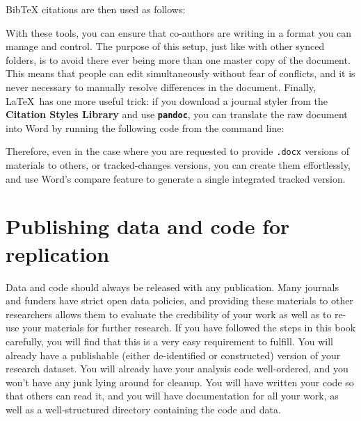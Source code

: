 \noindent BibTeX citations are then used as follows:


With these tools, you can ensure that co-authors are writing
in a format you can manage and control.\cite{flom2005latex}
The purpose of this setup, just like with other synced folders,
is to avoid there ever being more than one master copy of the document.
This means that people can edit simultaneously without fear of conflicts,
and it is never necessary to manually resolve differences in the document.
Finally, \LaTeX\ has one more useful trick:
if you download a journal styler from the \textbf{Citation Styles Library}
and use \textbf{\texttt{pandoc}},
you can translate the raw document into Word by running the following code from the command line:


Therefore, even in the case where you are requested to provide
\texttt{.docx} versions of materials to others, or tracked-changes versions,
you can create them effortlessly,
and use Word's compare feature to generate a single integrated tracked version.


\section{Publishing data and code for replication}

Data and code should always be released with any publication.
Many journals and funders have strict open data policies,
and providing these materials to other researchers
allows them to evaluate the credibility of your work
as well as to re-use your materials for further research.
If you have followed the steps in this book carefully,
you will find that this is a very easy requirement to fulfill.
You will already have a publishable (either de-identified or constructed)
version of your research dataset.
You will already have your analysis code well-ordered,
and you won't have any junk lying around for cleanup.
You will have written your code so that others can read it,
and you will have documentation for all your work,
as well as a well-structured directory containing the code and data.

